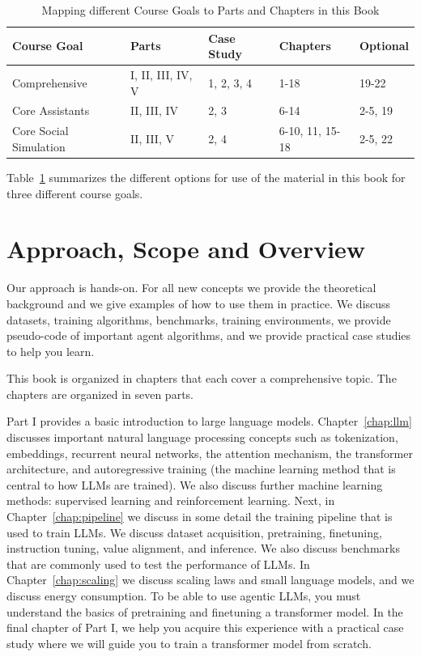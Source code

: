 \begin{table}
    \centering
    \begin{tabular}{l|l|l|l|l}
        Course Goal & Parts & Case Study& Chapters & Optional  \\ \hline
        Comprehensive & I, II, III, IV, V & 1, 2, 3, 4 & 1-18 & 19-22\\
        Core Assistants & II, III, IV & 2, 3 & 6-14 & 2-5, 19\\
        Core Social Simulation & II, III, V & 2, 4 & 6-10, 11, 15-18 & 2-5, 22\\
    \end{tabular}
    \caption{Mapping different Course Goals to Parts and Chapters in this Book}
    \label{tab:flow}
\end{table}

Table~\ref{tab:flow} summarizes the different options for use of the material in this book for three different course goals. 


\section{Approach, Scope and Overview}
Our approach is hands-on. For all new concepts we  provide the  theoretical background and we give examples of how to use them in practice. We discuss datasets, training algorithms, benchmarks, training environments, we provide pseudo-code of important agent algorithms, and we provide practical case studies to help you learn. 

This book is organized in chapters that each cover a comprehensive topic. The chapters are organized in seven parts. 

Part I provides a basic introduction to large language models. Chapter~\ref{chap:llm} discusses important  natural language processing concepts such as tokenization, embeddings, recurrent neural networks, the  attention mechanism, the transformer architecture, and autoregressive training (the machine learning method that is central to how LLMs are trained). We also discuss further machine learning methods: supervised learning and reinforcement learning. Next, in Chapter~\ref{chap:pipeline} we discuss in some detail the training pipeline that is used to train LLMs. We discuss dataset acquisition, pretraining, finetuning, instruction tuning, value alignment, and inference. We also discuss benchmarks that are commonly used to test the performance of LLMs. In Chapter~\ref{chap:scaling} we discuss scaling laws and small language models, and we discuss energy consumption. To be able to use agentic LLMs, you must understand the basics of pretraining and finetuning a transformer model. In the final chapter of Part I, we help you acquire this experience with a practical case study where we will guide you to train a transformer model from scratch. 

